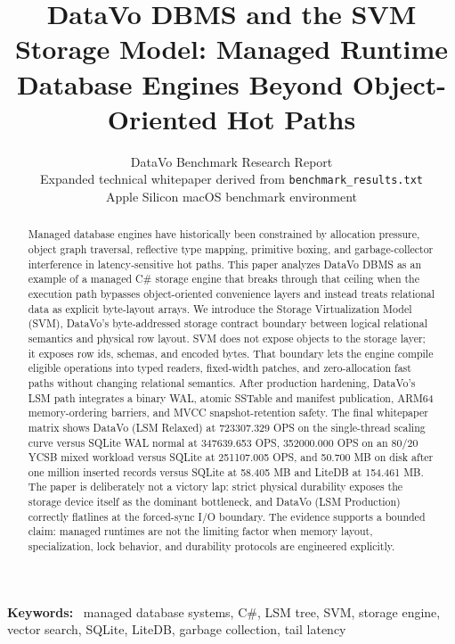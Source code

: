 \documentclass[11pt]{article}
\title{DataVo DBMS and the SVM Storage Model: Managed Runtime Database Engines Beyond Object-Oriented Hot Paths}
\author{DataVo Benchmark Research Report\\
\small Expanded technical whitepaper derived from \texttt{benchmark\_results.txt}\\
\small Apple Silicon macOS benchmark environment}
\date{}
\newenvironment{IEEEkeywords}{%
  \par\smallskip\noindent\textbf{Keywords:}\ }{\par\smallskip}
\begin{document}
\maketitle

\begin{abstract}
Managed database engines have historically been constrained by allocation pressure, object graph traversal, reflective type mapping, primitive boxing, and garbage-collector interference in latency-sensitive hot paths. This paper analyzes DataVo DBMS as an example of a managed C\# storage engine that breaks through that ceiling when the execution path bypasses object-oriented convenience layers and instead treats relational data as explicit byte-layout arrays. We introduce the Storage Virtualization Model (SVM), DataVo's byte-addressed storage contract boundary between logical relational semantics and physical row layout. SVM does not expose objects to the storage layer; it exposes row ids, schemas, and encoded bytes. That boundary lets the engine compile eligible operations into typed readers, fixed-width patches, and zero-allocation fast paths without changing relational semantics. After production hardening, DataVo's LSM path integrates a binary WAL, atomic SSTable and manifest publication, ARM64 memory-ordering barriers, and MVCC snapshot-retention safety. The final whitepaper matrix shows DataVo (LSM Relaxed) at \num{723307.329} OPS on the single-thread scaling curve versus SQLite WAL normal at \num{347639.653} OPS, \num{352000.000} OPS on an 80/20 YCSB mixed workload versus SQLite at \num{251107.005} OPS, and \num{50.700} MB on disk after one million inserted records versus SQLite at \num{58.405} MB and LiteDB at \num{154.461} MB. The paper is deliberately not a victory lap: strict physical durability exposes the storage device itself as the dominant bottleneck, and DataVo (LSM Production) correctly flatlines at the forced-sync I/O boundary. The evidence supports a bounded claim: managed runtimes are not the limiting factor when memory layout, specialization, lock behavior, and durability protocols are engineered explicitly.
\end{abstract}

\begin{IEEEkeywords}
managed database systems, C\#, LSM tree, SVM, storage engine, vector search, SQLite, LiteDB, garbage collection, tail latency
\end{IEEEkeywords}
\end{document}

